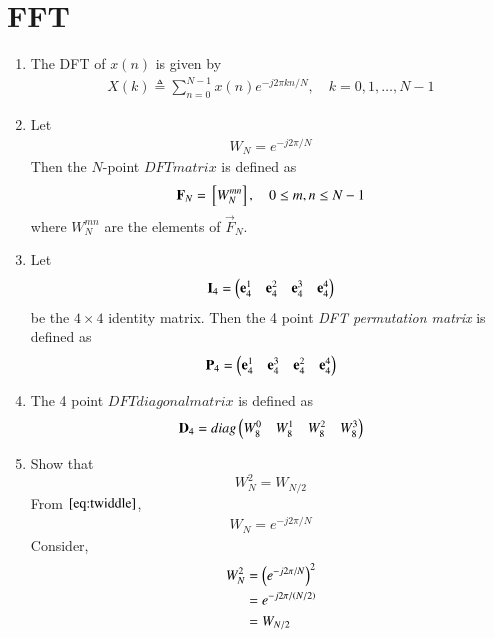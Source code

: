 \documentclass[journal,12pt,twocolumn]{IEEEtran}
\renewcommand\thesection{\arabic{section}}
\begin{document}
\section{FFT}
\begin{enumerate}[label=\arabic*.,ref=\thesection.\theenumi]
	\item The DFT of $x(n)$ is given by
	\begin{align}
		X(k) \triangleq \sum_{n=0}^{N-1} x(n) e^{-j 2 \pi k n / N}, \quad k=0,1, \ldots, N-1
	\end{align}
	\item Let 
	\begin{align}
		W_{N} = e^{-j2\pi/N} \label{eq:twiddle}
	\end{align}
	Then the $N$-point ${ DFT matrix}$ is defined as 
	\begin{align}
		\mathbf{F}_{N} = {}\left[W_{N}^{mn}\right], \quad 0 \le m,n \le N-1 \label{def:N-point_matrix} 
	\end{align}
	where $W_{N}^{mn}$ are the elements of $\vec{F}_{N}$.
	\item Let 
	\begin{align}
		\mathbf{I}_4 = \begin{pmatrix}\mathbf{e}_4^{1} &\mathbf{e}_4^{2} &\mathbf{e}_4^{3} &\mathbf{e}_4^{4} \end{pmatrix}
	\end{align}
	be the $4\times 4$ identity matrix.  Then the 4 point {\em DFT permutation matrix} is defined as 
	\begin{align}
		\mathbf{P}_4 = \begin{pmatrix}\mathbf{e}_4^{1} &\mathbf{e}_4^{3} &\mathbf{e}_4^{2} &\mathbf{e}_4^{4} \end{pmatrix} \label{elem_mat}
	\end{align}
	\item The 4 point ${ DFT diagonal matrix}$ is defined as 
	\begin{align}
		\mathbf{D}_4 = diag\begin{pmatrix}W_{8}^{0} & W_{8}^{1} & W_{8}^{2} & W_{8}^{3}\end{pmatrix}
	\end{align}
	\item Show that 
	\begin{equation}
		W_{N}^{2}=W_{N/2} \label{fft-3}
	\end{equation}
	\solution 
	From $\eqref{eq:twiddle}$,
	\begin{align}
		W_{N} = e^{-j2\pi/N}
	\end{align}
	Consider,
	\begin{align}
		W_{N}^{2} &= \left(e^{-j2\pi/N}\right)^2 \\
		&= e^{-j2\pi/\left(N/2\right)} \\
		&= W_{N/2}\label{result}
	\end{align}


\end{enumerate}
\end{document}

